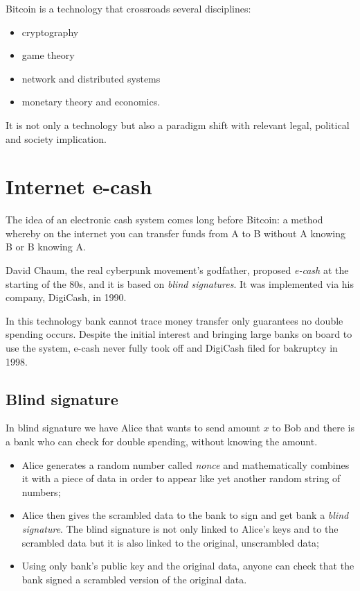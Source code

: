 Bitcoin is a technology that crossroads several disciplines:
\begin{itemize}
    \item cryptography
    \item game theory
    \item network and distributed systems
    \item monetary theory and economics.
\end{itemize}
It is not only a technology but also a paradigm shift with relevant legal, political and society implication.

\section{Internet e-cash}
The idea of an electronic cash system comes long before Bitcoin: a method whereby on the internet you can transfer funds from A to B without A knowing B or B knowing A.

David Chaum, the real cyberpunk movement's godfather, proposed \emph{e-cash} at the starting of the 80s, and it is based on \emph{blind signatures}.
It was implemented via his company, DigiCash, in 1990.

In this technology bank cannot trace money transfer only guarantees no double spending occurs.
Despite the initial interest and bringing large banks on board to use the system, e-cash never fully took off and DigiCash filed for bakruptcy in 1998.

\subsection{Blind signature}
In blind signature we have Alice that wants to send amount $x$ to Bob and there is a bank who can check for double spending, without knowing the amount.
\begin{itemize}
    \item Alice generates a random number called \emph{nonce} and mathematically combines it with a piece of data in order to appear like yet another random string of numbers;
    \item Alice then gives the scrambled data to the bank to sign and get bank a \emph{blind signature}.
    The blind signature is not only linked to Alice's keys and to the scrambled data but it is also linked to the original, unscrambled data;
    \item Using only bank's public key and the original data, anyone can check that the bank signed a scrambled version of the original data.
\end{itemize}

